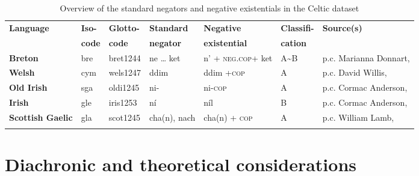 \documentclass[output=paper]{langsci/langscibook}
\begin{document}
\begin{table}\begin{small}
\caption{Overview of the standard negators and negative existentials in the
Celtic dataset}\label{tab:ieur-class-Celtic}
\begin{tabularx}{\textwidth}{@{} p{14mm} l l p{14mm} p{16mm} l Q @{}}
\lsptoprule
\textbf{Language} & \textbf{Iso-} & \textbf{Glotto-} & \textbf{Standard} &
\textbf{Negative} & \textbf{Classifi-} & \textbf{Source(s)}\\
& \textbf{code} & \textbf{code} & \textbf{negator} & \textbf{existential} &
\textbf{cation} \\
\midrule
    \textbf{Breton} & bre & bret1244 & ne … ket & n’ +\newline
    \textsc{neg.cop}\newline +  ket & A{\textasciitilde}B & p.c. Marianna Donnart, \citet{Press1986}\\
\midrule
    \textbf{Welsh} & cym & wels1247 & ddim & ddim +\newline \textsc{cop} & A & p.c. David Willis, \citet{King2003}\\
\midrule
\textbf{Old Irish} & sga & oldi1245 & ni- & ni-\textsc{cop} & A & p.c. Cormac
Anderson, \textcites{Stenson1981}{Stenson2008}\\
\midrule
\textbf{Irish} & gle & iris1253 & ní & níl & B & p.c. Cormac Anderson, \citet{McCone2005}\\
\midrule
\textbf{Scottish Gaelic} & gla & scot1245 & cha(n), nach & cha(n) +\newline
    \textsc{cop} & A & p.c. William Lamb, \citet{Lamb2001}\\
\lspbottomrule
\end{tabularx}
\end{small}\end{table}

\section{Diachronic and theoretical considerations}\label{sec:ieur-5}
\end{document}
